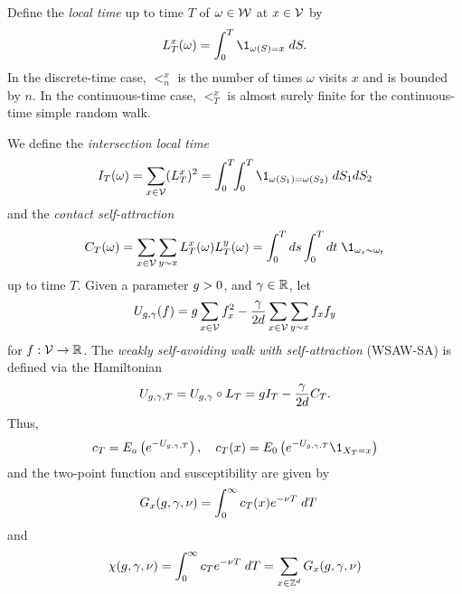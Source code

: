 Define the \emph{local time} up to time $T$ of $\omega \in \mathcal{W}$ at
$x \in \mathcal{V}$ by
\begin{equation}
\label{e:LTx-def}
\lt^x_T(\omega) = \int_0^T \1_{\omega(S)=x} \; dS.
\end{equation}
In the discrete-time case, $\lt^x_n$ is the number of times $\omega$ visits $x$
and is bounded by $n$. In the continuous-time case, $\lt^x_T$ is almost surely
finite for the continuous-time simple random walk.

We define the \emph{intersection local time}
\begin{equation}
\label{e:ITdef}
I_T(\omega) = \sum_{x\in\vertices} (\lt^x_T)^2
  =
\int_0^T \!\! \int_0^T \1_{\omega(S_1)=\omega(S_2)} \; dS_1 dS_2
\end{equation}
and the \emph{contact self-attraction}
\begin{equation}
\label{e:CTdef}
C_T(\omega)
	=
\sum_{x \in \vertices} \sum_{y \sim x} \lt_T^x(\omega) \lt_T^y(\omega)
	=
\int_0^T ds \int_0^T dt \; \1_{\omega_s \sim \omega_t}
\end{equation}
up to time $T$.
Given a parameter $g > 0$, and $\gamma \in {\mathbb R}$, let
\begin{equation}
\label{e:Udef-neg}
U_{g,\gamma}(f)
=
g \sum_{x\in\mathcal{V}} f_x^2
- \frac{\gamma}{2d}
\sum_{x\in\mathcal{V}} \sum_{y \sim x} f_x f_y
\end{equation}
for $f : \mathcal{V} \rightarrow {\mathbb R}$.
The \emph{weakly self-avoiding walk with self-attraction} (WSAW-SA) is defined via the Hamiltonian
\begin{equation}
\label{e:V}
U_{g,\gamma,T}
	= U_{g,\gamma} \circ L_T
	= g I_T - \frac{\gamma}{2 d} C_T.
\end{equation}
Thus,
\begin{equation}
\label{e:c}
    c_T = E_a\left(e^{-U_{\gcc,\gamma,T}}\right),
    \quad
    c_T(x) = E_0\left(e^{-U_{\gcc,\gamma,T}}\1_{X_T = x}\right)
\end{equation}
and the two-point function and susceptibility are given by
\begin{align}
\lbeq{Gsa}
G_x(\gcc,\gamma,\nu)
    &=
\int_0^\infty c_T(x) e^{-\nu T} \; dT
\end{align}
and
\begin{equation}
\label{e:suscept-def}
\chi(g, \gamma, \nu)
	=
\int_0^\infty c_T e^{-\nu T} \; dT
	=
\sum_{x\in{ {{\mathbb Z}}^d }} G_x(g,\gamma,\nu)
\end{equation}

